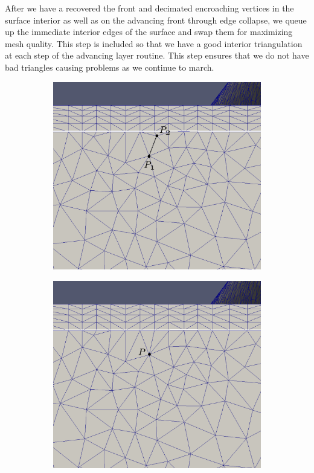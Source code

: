 \documentclass[conf]{new-aiaa}
\begin{document}
After we have a recovered the front and decimated encroaching vertices in the surface interior as well as on the advancing front through edge collapse, we queue up the immediate interior edges of the surface and swap them for maximizing mesh quality. This step is included so that we have a good interior triangulation at each step of the advancing layer routine. This step ensures that we do not have bad triangles causing problems as we continue to march.

\begin{figure}[hbt!]
\centering
\begin{subfigure}{.4\textwidth}
  \centering
  \includegraphics[width=.9\linewidth, trim={0 5cm 0  0}, clip]{interior-vert-collapse/cc1.eps}
  \caption{}
  \label{cc1}
\end{subfigure}%
\begin{subfigure}{.4\textwidth}
  \centering
  \includegraphics[width=.9\linewidth, trim={0 5cm 0  0}, clip]{interior-vert-collapse/cc2.eps}

\end{subfigure}
\end{figure}
\end{document}
